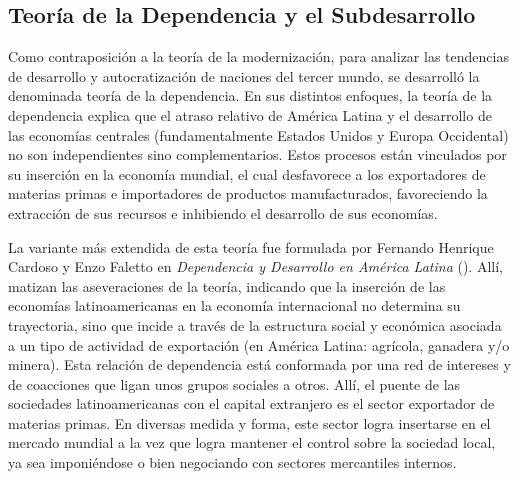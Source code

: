 \documentclass{article}
\begin{document}
\subsection{Teoría de la Dependencia y el Subdesarrollo}

Como contraposición a la teoría de la modernización, para analizar las tendencias de
desarrollo y autocratización de naciones del tercer mundo, se desarrolló la denominada
teoría de la dependencia. En sus distintos enfoques, la teoría de la dependencia explica
que el atraso relativo de América Latina y el desarrollo de las economías centrales
(fundamentalmente Estados Unidos y Europa Occidental) no son independientes sino 
complementarios. Estos procesos están vinculados por su inserción en la economía mundial,
el cual desfavorece a los exportadores de materias primas e importadores de productos
manufacturados, favoreciendo la extracción de sus recursos e inhibiendo el desarrollo
de sus economías.

La variante más extendida de esta teoría fue formulada por Fernando Henrique Cardoso
y Enzo Faletto en \textit{Dependencia y Desarrollo en América Latina} 
(\citeyear{cardoso1979dependencia}). Allí, matizan las aseveraciones de la teoría, 
indicando que la inserción de las economías latinoamericanas en la economía internacional
no determina su trayectoria, sino que incide a través de la estructura social y económica
asociada a un tipo de actividad de exportación (en América Latina: agrícola, ganadera y/o
minera). Esta relación de dependencia está conformada por una red de intereses y de 
coacciones que ligan unos grupos sociales a otros. Allí, el puente de las sociedades 
latinoamericanas con el capital extranjero es el sector exportador de materias primas. 
En diversas medida y forma, este sector logra insertarse en el mercado mundial a la vez 
que logra mantener el control sobre la sociedad local, ya sea imponiéndose o bien 
negociando con sectores mercantiles internos.
\end{document}
